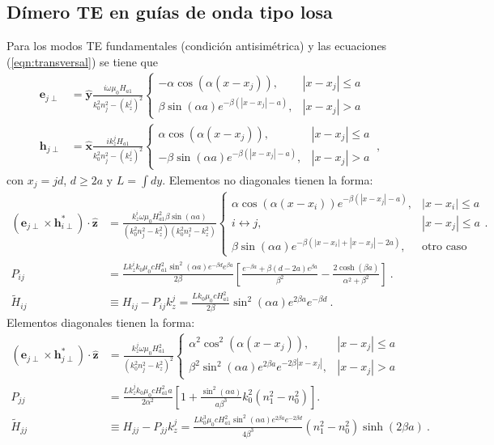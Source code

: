 \subsection{Dímero TE en guías de onda tipo losa}
Para los modos TE fundamentales (condición antisimétrica) y las ecuaciones (\ref{eqn:transversal}) se tiene que
\begin{align*}
	\textbf{e}_{j\perp} &= \hat{\textbf{y}}\frac{i\omega\mu_0 H_{a1}}{k_0^2n_j^2 - (k_z^j)^2}\left\{ \begin{matrix}
-\alpha \cos(\alpha (x-x_j)), &|x-x_j|\le a
\\
\beta\sin(\alpha a) e^{-\beta(|x-x_j|-a)}, &|x-x_j| > a
\end{matrix}\right.
\\
\textbf{h}_{j\perp} &= \hat{\textbf{x}}\frac{ik_z^j H_{a1}}{k_0^2n_j^2 - (k_z^j)^2}\left\{ \begin{matrix}
\alpha \cos(\alpha (x-x_j)), &|x-x_j|\le a
\\
-\beta\sin(\alpha a) e^{-\beta(|x-x_j|-a)}, &|x-x_j| > a
\end{matrix}\right. \ ,
\end{align*} con $x_j=jd$, $d\ge 2a$ y $L=\int dy$. Elementos no diagonales tienen la forma:
\begin{align*}
	\left(\textbf{e}_{j\perp}\times\textbf{h}_{i\perp}^*\right)\cdot \hat{\textbf{z}}
	&=
	\frac{k_z^i \omega \mu_0 H_{a1}^2 \beta\sin(\alpha a)}{(k_0^2n_j^2 - k_z^2)(k_0^2n_i^2 - k_z^2)}
	\left\{
	\begin{matrix}
		 \alpha\cos(\alpha(x-x_i))e^{-\beta(|x-x_j|-a)}, & |x-x_i| \le a
		\\
		i \leftrightarrow j, & |x-x_j| \le a
		\\
		\beta \sin(\alpha a)e^{-\beta (|x-x_i|+|x-x_j|-2a)}, & \text{otro caso}
	\end{matrix}
	\right. .
\\
	P_{ij} &= \frac{L k_z^i k_0  \mu_0 c H_{a1}^2 \sin^2(\alpha a)e^{-\beta d}e^{\beta a}}{2\beta} \left[\frac{e^{-\beta a} + \beta (d-2a)e^{\beta a}}{\beta^2} - \frac{2\cosh(\beta a)}{\alpha^2+\beta^2} \right] \ .
\\
	\tilde{H}_{ij} &\equiv H_{ij} - P_{ij} k_z^j = \frac{L k_0    \mu_0 c H_{a1}^2 }{2 \beta }  \sin^2(\alpha a)e^{2\beta a} e^{-\beta d} \ .
\end{align*}
Elementos diagonales tienen la forma:
\begin{align*}
	\left(\textbf{e}_{j\perp}\times\textbf{h}_{j\perp}^*\right)\cdot \hat{\textbf{z}}&=\frac{k_z^j\omega\mu_0 H_{a1}^2}{(k_0^2n_j^2-k_z^2)^2} \left\{ \begin{matrix}
\alpha^2\cos^2(\alpha (x-x_j)), & |x-x_j| \le a
\\
\beta^2 \sin^2(\alpha a) e^{2\beta a} e^{-2\beta|x-x_j|}, & |x-x_j|>a
\end{matrix}\right.
\\
	P_{jj} &= \frac{L k_z^j  k_0 \mu_0 c H_{a1}^2  a}{2 \alpha^2} \left[1 + \frac{\sin^2(\alpha a)}{a \beta^3 } k_0^2 \left( n_1^2 - n_0^2 \right) \right].
\\
	\tilde{H}_{jj} &\equiv H_{jj} - P_{jj} k_z^j =
	\frac{L k_0^3  \mu_0 c H_{a1}^2 \sin^2(\alpha a)e^{2\beta a}e^{-2\beta d}}{4 \beta^3 } (n_1^2-n_0^2) \sinh(2\beta a) \ .
\end{align*}
